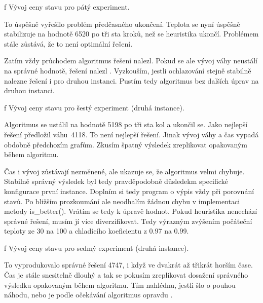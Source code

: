 \centerline{ \picwidth=15cm  }
\caption/f Vývoj ceny stavu pro pátý experiment.
\bigskip

To úspěšně vyřešilo problém předčasného ukončení. Teplota se nyní úspěšně stabilizuje na hodnotě 6520 po tři sta kroků, než se heuristika ukončí. Problémem stále zůstává, že to není optimální řešení.

Zatím vždy průchodem algoritmus řešení nalezl. Pokud se ale vývoj váhy neustálí na správné hodnotě, řešení nalezl . Vyzkouším, jestli ochlazování stejně stabilně nalezne řešení i pro druhou instanci. Pustím tedy algoritmus bez dalších úprav na druhou instanci.

\centerline{ \picwidth=15cm  }
\caption/f Vývoj ceny stavu pro šestý experiment (druhá instance).
\bigskip
\vfill\break

Algoritmus se ustálil na hodnotě 5198 po tři sta kol a ukončil se. Jako nejlepší řešení předložil váhu~4118. To není nejlepší řešení. Jinak vývoj váhy a čas vypadá obdobně předchozím grafům. Zkusím špatný výsledek zreplikovat opakovaným během algoritmu.

\bigskip
\centerline{}\bigskip

Čas i vývoj zůstávají nezměnené, ale ukazuje se, že algoritmus velmi chybuje. Stabilně správný výsledek byl tedy pravděpodobně důsledekm specifické konfigurace první instance. Doplním si tedy program o výpis vždy při porovnání stavů. Po bližším prozkoumání ale neodhalím žádnou chybu v implementaci metody is\_better(). Vrátím se tedy k úpravě hodnot. Pokud heuristika nenechází správné řešení, musím jí více diverzifikovat. Tedy výrazným zvýšením počáteční teploty ze 30 na 100 a chladícího koeficientu z 0.97 na 0.99.

\centerline{ \picwidth=15cm  }
\caption/f Vývoj ceny stavu pro sedmý experiment (druhá instance).
\bigskip

To vyprodukovalo správné řešení 4747, i když ve dvakrát až třikrát horším čase. Čas je stále snesitelně dlouhý a tak se pokusím zreplikovat dosažení správného výsledku opakovaným během algoritmu. Tím nahlédnu, jestli šlo o pouhou náhodu, nebo je podle očekávání algoritmus opravdu .

\bigskip
\centerline{}\bigskip

